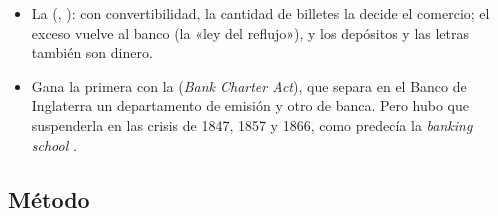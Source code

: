 \documentclass[11pt]{article}
\begin{document}
\begin{itemize}
\begin{itemize}
  \item La  (, ): con convertibilidad, la cantidad de billetes la decide el comercio; el exceso vuelve al banco (la «ley del reflujo»), y los depósitos y las letras también son dinero\nocite{Tooke1844Inquiry,Fullarton1844Regulation}.
  \item Gana la primera con la  (\emph{Bank Charter Act}), que separa en el Banco de Inglaterra un departamento de emisión y otro de banca. Pero hubo que suspenderla en las crisis de 1847, 1857 y 1866, como predecía la \emph{banking school} .
  \end{itemize}
\end{itemize}

\subsection{Método}\label{sec:metodo}
\end{document}
